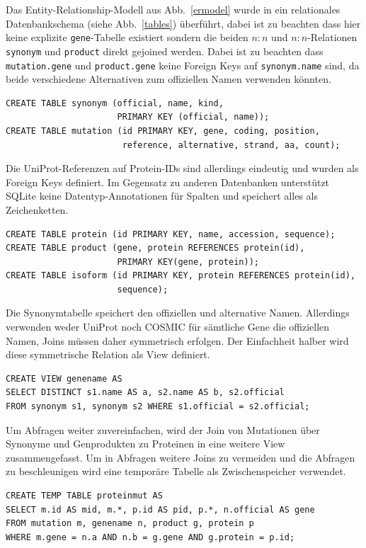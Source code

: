 \documentclass{scrartcl}
\begin{document}
Das Entity-Relationship-Modell aus Abb.~\ref{ermodel} wurde in ein relationales Datenbankschema (siehe Abb.~\ref{tables}) überführt, dabei ist zu beachten dass hier keine explizite \texttt{gene}-Tabelle existiert sondern die beiden $n:n$ und $n:n$-Relationen \texttt{synonym} und \texttt{product} direkt gejoined werden. Dabei ist zu beachten dass \texttt{mutation.gene} und \texttt{product.gene} keine Foreign Keys auf \texttt{synonym.name} sind, da beide verschiedene Alternativen zum offiziellen Namen verwenden könnten.
\begin{verbatim}
CREATE TABLE synonym (official, name, kind,
                      PRIMARY KEY (official, name));
CREATE TABLE mutation (id PRIMARY KEY, gene, coding, position,
                       reference, alternative, strand, aa, count);
\end{verbatim}
Die UniProt-Referenzen auf Protein-IDs sind allerdings eindeutig und wurden als Foreign Keys definiert. Im Gegensatz zu anderen Datenbanken unterstützt SQLite keine Datentyp-Annotationen für Spalten und speichert alles als Zeichenketten.
\begin{verbatim}
CREATE TABLE protein (id PRIMARY KEY, name, accession, sequence);
CREATE TABLE product (gene, protein REFERENCES protein(id),
                      PRIMARY KEY(gene, protein));
CREATE TABLE isoform (id PRIMARY KEY, protein REFERENCES protein(id),
                      sequence);
\end{verbatim}
Die Synonymtabelle speichert den offiziellen und alternative Namen. Allerdings verwenden weder UniProt noch COSMIC für sämtliche Gene die offiziellen Namen, Joins müssen daher symmetrisch erfolgen. Der Einfachheit halber wird diese symmetrische Relation als View definiert.
\begin{verbatim}
CREATE VIEW genename AS
SELECT DISTINCT s1.name AS a, s2.name AS b, s2.official
FROM synonym s1, synonym s2 WHERE s1.official = s2.official;
\end{verbatim}
Um Abfragen weiter zuvereinfachen, wird der Join von Mutationen über Synonyme und Genprodukten zu Proteinen in eine weitere View zusammengefasst. Um in Abfragen weitere Joins zu vermeiden und die Abfragen zu beschleunigen wird eine temporäre Tabelle als Zwischenspeicher verwendet.
\begin{verbatim}
CREATE TEMP TABLE proteinmut AS
SELECT m.id AS mid, m.*, p.id AS pid, p.*, n.official AS gene
FROM mutation m, genename n, product g, protein p
WHERE m.gene = n.a AND n.b = g.gene AND g.protein = p.id;
\end{verbatim}
\end{document}
